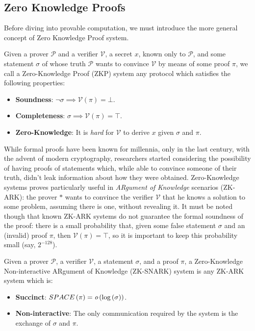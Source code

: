 \subsection{Zero Knowledge Proofs}
Before diving into provable computation, we must introduce the more general concept of Zero
Knowledge Proof system.
\begin{definition}
	Given a prover \(\mathcal{P}\) and a verifier \(\mathcal{V}\), a secret \(x\), known only to
	\(\mathcal{P}\), and some statement \(\sigma \) of whose truth \(\mathcal{P}\) wants to convince
	\(\mathcal{V}\) by means of some proof \(\pi \), we call a Zero-Knowledge Proof (ZKP) system any
	protocol which satisfies the following properties:
	\begin{itemize}
		\item \textbf{Soundness}: \(\neg{\sigma} \implies \mathcal{V}\left(\pi\right) = \bot \).
		\item \textbf{Completeness}: \(\sigma \implies \mathcal{V}\left(\pi\right) = \top \).
		\item \textbf{Zero-Knowledge}: It is \emph{hard} for \(\mathcal{V}\) to derive \(x\) given
		      \(\sigma \) and \(\pi \).
	\end{itemize}
\end{definition}

\noindent While formal proofs have been known for millennia, only in the last century, with the
advent of modern cryptography, researchers started considering the possibility of having proofs
of statements which, while able to convince someone of their truth, didn't leak information
about how they were obtained.
Zero-Knowledge systems proves particularly useful in \emph{ARgument of Knowledge} scenarios
(ZK-ARK): the prover \(*\) wants to convince the verifier \(\mathcal{V}\) that he
knows a solution to some problem, assuming there is one, without revealing it.
It must be noted though that known ZK-ARK systems do not guarantee the formal soundness of
the proof: there is a small probability that, given some false statement \(\sigma \) and an
(invalid) proof \(\pi \), then \(\mathcal{V}\left(\pi\right) = \top \), so it is important to keep
this probability small (say, \(2^{-128}\)).
\begin{definition}
	Given a prover \(\mathcal{P}\), a verifier \(\mathcal{V}\), a statement \(\sigma \), and a proof
	\(\pi \), a Zero-Knowledge Non-interactive ARgument of Knowledge (ZK-SNARK) system is any
	ZK-ARK system which is:
	\begin{itemize}
		\item \textbf{Succinct}: \(SPACE\left(\pi\right) =
		      \textit{o}\left(\log\left(\sigma\right)\right)\).
		\item \textbf{Non-interactive}: The only communication required by the system is the exchange
		      of \(\sigma \) and \(\pi \).
	\end{itemize}
\end{definition}

